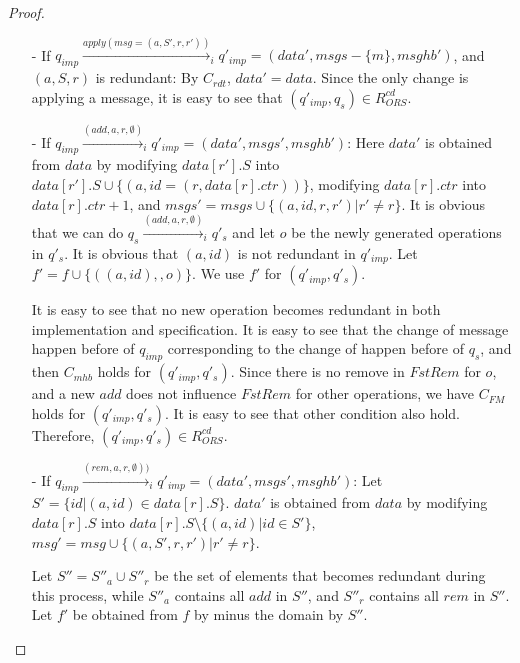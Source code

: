 \begin {proof}
\begin{itemize}
\item[-] If $q_{\mathit{imp}} \xrightarrow{\mathit{apply}( \mathit{msg}=(a,S',r,r' ))}_i q'_{\mathit{imp}} = (\mathit{data}',\mathit{msgs} - \{ m \},\mathit{msghb}')$, and $(a,S,r)$ is redundant: By $C_{\mathit{rdt}}$, $\mathit{data}' = \mathit{data}$. Since the only change is applying a message, it is easy to see that $(q'_{\mathit{imp}},q_s) \in R_{\mathit{ORS}}^{\mathit{cd}}$.

\item[-] If $q_{\mathit{imp}} \xrightarrow{(\mathit{add},a,r,\emptyset)}_i q'_{\mathit{imp}} = (\mathit{data}',\mathit{msgs}',\mathit{msghb}')$: Here $\mathit{data}'$ is obtained from $\mathit{data}$ by modifying $\mathit{data}[r'].S$ into $\mathit{data}[r'].S \cup \{ (a,\mathit{id} = (r,\mathit{data}[r].\mathit{ctr})) \}$, modifying $\mathit{data}[r].\mathit{ctr}$ into $\mathit{data}[r].\mathit{ctr}+1$, and $\mathit{msgs}' = \mathit{msgs} \cup \{ (a,\mathit{id},r,r') \vert r' \neq r \}$. It is obvious that we can do $q_s \xrightarrow{( \mathit{add},a,r,\emptyset )}_i q'_s$ and let $o$ be the newly generated operations in $q'_s$. It is obvious that $(a,\mathit{id})$ is not redundant in $q'_{\mathit{imp}}$. Let $f' = f \cup \{ ((a,id),,o) \}$. We use $f'$ for $(q'_{\mathit{imp}},q'_s)$.

    It is easy to see that no new operation becomes redundant in both implementation and specification. It is easy to see that the change of message happen before of $q_{\mathit{imp}}$ corresponding to the change of happen before of $q_s$, and then $C_{\mathit{mhb}}$ holds for $(q'_{\mathit{imp}},q'_s)$. Since there is no remove in $\mathit{FstRem}$ for $o$, and a new $\mathit{add}$ does not influence $\mathit{FstRem}$ for other operations, we have $C_{\mathit{FM}}$ holds for $(q'_{\mathit{imp}},q'_s)$. It is easy to see that other condition also hold. Therefore, $(q'_{\mathit{imp}},q'_s) \in R_{\mathit{ORS}}^{\mathit{cd}}$.

\item[-] If $q_{\mathit{imp}} \xrightarrow{( \mathit{rem},a,r,\emptyset ))}_i q'_{\mathit{imp}} = (\mathit{data}',\mathit{msgs}',\mathit{msghb}')$: Let $S' = \{ \mathit{id} \vert (a,\mathit{id}) \in \mathit{data}[r].S \}$. $\mathit{data}'$ is obtained from $\mathit{data}$ by modifying $\mathit{data}[r].S$ into $\mathit{data}[r].S \setminus \{ (a,\mathit{id}) \vert \mathit{id} \in S'\}$, $\mathit{msg}' = \mathit{msg} \cup \{ (a,S',r,r') \vert r' \neq r \}$.

    Let $S'' = S''_a \cup S''_r$ be the set of elements that becomes redundant during this process, while $S''_a$ contains all $\mathit{add}$ in $S''$, and $S''_r$ contains all $\mathit{rem}$ in $S''$. Let $f'$ be obtained from $f$ by minus the domain by $S''$.


\end{itemize}
\end{proof}
